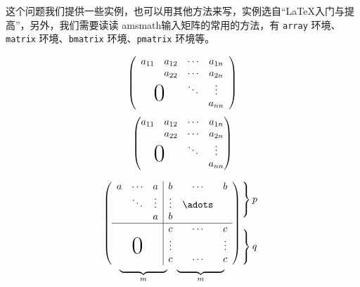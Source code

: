 这个问题我们提供一些实例，也可以用其他方法来写，实例选自``\LaTeX{}入门与提高''，另外，我们需要读读
amsmath输入矩阵的常用的方法，有 \verb|array| 环境、\verb|matrix| 环境、\verb|bmatrix| 环境、\verb|pmatrix| 环境等。
\begin{example}
\[\left(\begin{array}{cccc}
  a_{11} & a_{12} & \cdots & a_{1n} \\
  &a_{22}  & \cdots &a_{2n}  \\
  &        & \ddots & \vdots \\
  \multicolumn{2}{c}{\raisebox{1.3ex}[0pt]{\Huge0}}
  &        &a_{nn}
\end{array}\right)\]
\[\begin{pmatrix}
  a_{11} & a_{12} & \cdots & a_{1n} \\
  &a_{22}  & \cdots &a_{2n}  \\
  &        & \ddots & \vdots \\
  \multicolumn{2}{c}{\raisebox{1.3ex}[0pt]{\Huge0}}
  &        &a_{nn}
\end{pmatrix}\]
\end{example}
\begin{example}
\[
 \begin{array}{c@{\hspace{-5pt}}l}
  \left(\begin{array}{ccc|ccc}
   a&\cdots &a &b &\cdots&b\\
   &\ddots &\vdots &\vdots &\adots\\
   & &a& b \\\hline
   & & & c &\cdots &c\\
   & & & \vdots& &\vdots\\
   \multicolumn{3}{c|}{\raisebox{2ex}[0pt]{\Huge0}}
   & c & \cdots & c
  \end{array}\right)
  &\begin{array}{l}
    \left.\rule{0mm}{7mm}\right\}p\\
	\\\left.\rule{0mm}{7mm}\right\}q
   \end{array}\\[-5pt]
  \begin{array}{cc}
   \underbrace{\rule{17mm}{0mm}}_m&
   \underbrace{\rule{17mm}{0mm}}_m
  \end{array}&
 \end{array}
\]
\end{example}

